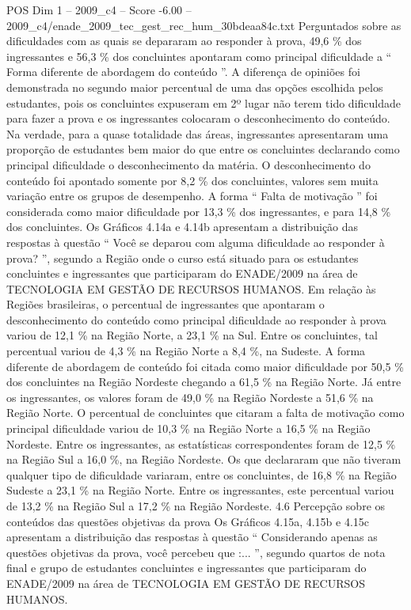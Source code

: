 \begin{textsample}{POS Dim 1 – 2009\_c4 – Score -6.00 – 2009\_c4/enade\_2009\_tec\_gest\_rec\_hum\_30bdeaa84c.txt}
Perguntados sobre as dificuldades com as quais se depararam ao responder à prova, 49,6 \% dos ingressantes e 56,3 \% dos concluintes apontaram como principal dificuldade a “ Forma diferente de abordagem do conteúdo ”.
A diferença de opiniões foi demonstrada no segundo maior percentual de uma das opções escolhida pelos estudantes, pois os concluintes expuseram em 2º lugar não terem tido dificuldade para fazer a prova e os ingressantes colocaram o desconhecimento do conteúdo.
Na verdade, para a quase totalidade das áreas, ingressantes apresentaram uma proporção de estudantes bem maior do que entre os concluintes declarando como principal dificuldade o desconhecimento da matéria.
O desconhecimento do conteúdo foi apontado somente por 8,2 \% dos concluintes, valores sem muita variação entre os grupos de desempenho.
A forma “ Falta de motivação ” foi considerada como maior dificuldade por 13,3 \% dos ingressantes, e para 14,8 \% dos concluintes.
Os Gráficos 4.14a e 4.14b apresentam a distribuição das respostas à questão “ Você se deparou com alguma dificuldade ao responder à prova? ”, segundo a Região onde o curso está situado para os estudantes concluintes e ingressantes que participaram do ENADE/2009 na área de TECNOLOGIA EM GESTÃO DE RECURSOS HUMANOS.
Em relação às Regiões brasileiras, o percentual de ingressantes que apontaram o desconhecimento do conteúdo como principal dificuldade ao responder à prova variou de 12,1 \% na Região Norte, a 23,1 \% na Sul.
Entre os concluintes, tal percentual variou de 4,3 \% na Região Norte a 8,4 \%, na Sudeste.
A forma diferente de abordagem de conteúdo foi citada como maior dificuldade por 50,5 \% dos concluintes na Região Nordeste chegando a 61,5 \% na Região Norte.
Já entre os ingressantes, os valores foram de 49,0 \% na Região Nordeste a 51,6 \% na Região Norte.
O percentual de concluintes que citaram a falta de motivação como principal dificuldade variou de 10,3 \% na Região Norte a 16,5 \% na Região Nordeste.
Entre os ingressantes, as estatísticas correspondentes foram de 12,5 \% na Região Sul a 16,0 \%, na Região Nordeste.
Os que declararam que não tiveram qualquer tipo de dificuldade variaram, entre os concluintes, de 16,8 \% na Região Sudeste a 23,1 \% na Região Norte.
Entre os ingressantes, este percentual variou de 13,2 \% na Região Sul a 17,2 \% na Região Nordeste. 4.6 Percepção sobre os conteúdos das questões objetivas da prova Os Gráficos 4.15a, 4.15b e 4.15c apresentam a distribuição das respostas à questão “ Considerando apenas as questões objetivas da prova, você percebeu que :... ”, segundo quartos de nota final e grupo de estudantes concluintes e ingressantes que participaram do ENADE/2009 na área de TECNOLOGIA EM GESTÃO DE RECURSOS HUMANOS.

\end{textsample}
